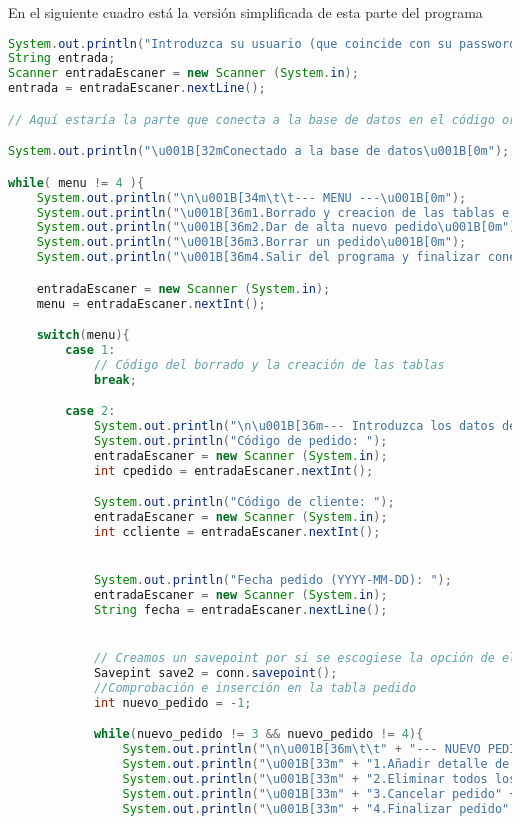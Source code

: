 En el siguiente cuadro está la versión simplificada de esta parte del programa
\begin{lstlisting}[language=Java]
System.out.println("Introduzca su usuario (que coincide con su password): ");
String entrada;
Scanner entradaEscaner = new Scanner (System.in);
entrada = entradaEscaner.nextLine();

// Aquí estaría la parte que conecta a la base de datos en el código original

System.out.println("\u001B[32mConectado a la base de datos\u001B[0m");

while( menu != 4 ){
	System.out.println("\n\u001B[34m\t\t--- MENU ---\u001B[0m");
	System.out.println("\u001B[36m1.Borrado y creacion de las tablas e insercion de tuplas\u001B[0m");
	System.out.println("\u001B[36m2.Dar de alta nuevo pedido\u001B[0m");
	System.out.println("\u001B[36m3.Borrar un pedido\u001B[0m");
	System.out.println("\u001B[36m4.Salir del programa y finalizar conexion\u001B[0m");

	entradaEscaner = new Scanner (System.in);
	menu = entradaEscaner.nextInt();

	switch(menu){
		case 1:
			// Código del borrado y la creación de las tablas
			break;

		case 2:
			System.out.println("\n\u001B[36m--- Introduzca los datos del pedido ---\u001B[0m");
			System.out.println("Código de pedido: ");
			entradaEscaner = new Scanner (System.in);
			int cpedido = entradaEscaner.nextInt();

			System.out.println("Código de cliente: ");
			entradaEscaner = new Scanner (System.in);
			int ccliente = entradaEscaner.nextInt();


			System.out.println("Fecha pedido (YYYY-MM-DD): ");
			entradaEscaner = new Scanner (System.in);
			String fecha = entradaEscaner.nextLine();


			// Creamos un savepoint por si se escogiese la opción de eliminar los detalles del pedido
			Savepint save2 = conn.savepoint();
			//Comprobación e inserción en la tabla pedido
			int nuevo_pedido = -1;

			while(nuevo_pedido != 3 && nuevo_pedido != 4){
				System.out.println("\n\u001B[36m\t\t" + "--- NUEVO PEDIDO ---" + "\u001B[0m");
				System.out.println("\u001B[33m" + "1.Añadir detalle de producto" + "\u001B[0m");
				System.out.println("\u001B[33m" + "2.Eliminar todos los detalles de producto" + "\u001B[0m");
				System.out.println("\u001B[33m" + "3.Cancelar pedido" + "\u001B[0m");
				System.out.println("\u001B[33m" + "4.Finalizar pedido" + "\u001B[0m");


\end{lstlisting}
